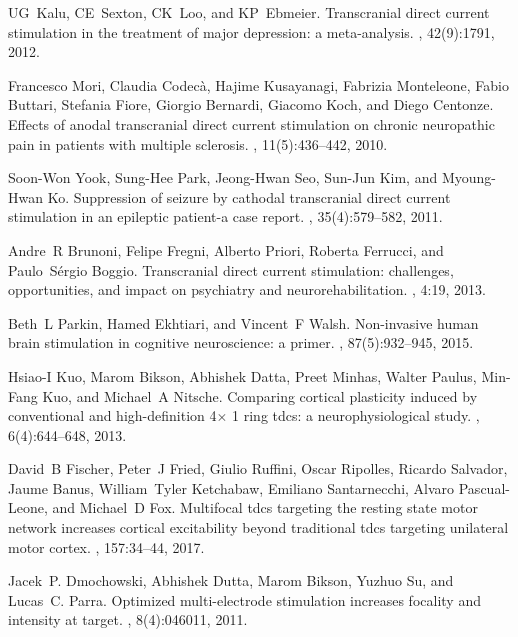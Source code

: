 \begin{thebibliography}{10}

UG~Kalu, CE~Sexton, CK~Loo, and KP~Ebmeier.
\newblock Transcranial direct current stimulation in the treatment of major depression: a meta-analysis.
, 42(9):1791, 2012.

Francesco Mori, Claudia Codec{\`a}, Hajime Kusayanagi, Fabrizia Monteleone, Fabio Buttari, Stefania Fiore, Giorgio Bernardi, Giacomo Koch, and Diego Centonze.
\newblock Effects of anodal transcranial direct current stimulation on chronic neuropathic pain in patients with multiple sclerosis.
, 11(5):436--442, 2010.

Soon-Won Yook, Sung-Hee Park, Jeong-Hwan Seo, Sun-Jun Kim, and Myoung-Hwan Ko.
\newblock Suppression of seizure by cathodal transcranial direct current stimulation in an epileptic patient-a case report.
, 35(4):579--582, 2011.

Andre~R Brunoni, Felipe Fregni, Alberto Priori, Roberta Ferrucci, and Paulo~S{\'e}rgio Boggio.
\newblock Transcranial direct current stimulation: challenges, opportunities, and impact on psychiatry and neurorehabilitation.
, 4:19, 2013.

Beth~L Parkin, Hamed Ekhtiari, and Vincent~F Walsh.
\newblock Non-invasive human brain stimulation in cognitive neuroscience: a primer.
, 87(5):932--945, 2015.

Hsiao-I Kuo, Marom Bikson, Abhishek Datta, Preet Minhas, Walter Paulus, Min-Fang Kuo, and Michael~A Nitsche.
\newblock Comparing cortical plasticity induced by conventional and high-definition 4$\times$ 1 ring tdcs: a neurophysiological study.
, 6(4):644--648, 2013.

David~B Fischer, Peter~J Fried, Giulio Ruffini, Oscar Ripolles, Ricardo Salvador, Jaume Banus, William~Tyler Ketchabaw, Emiliano Santarnecchi, Alvaro Pascual-Leone, and Michael~D Fox.
\newblock Multifocal tdcs targeting the resting state motor network increases cortical excitability beyond traditional tdcs targeting unilateral motor cortex.
, 157:34--44, 2017.

Jacek~P. Dmochowski, Abhishek Dutta, Marom Bikson, Yuzhuo Su, and Lucas~C. Parra.
\newblock Optimized multi-electrode stimulation increases focality and intensity at target.
, 8(4):046011, 2011.


\end{thebibliography}
